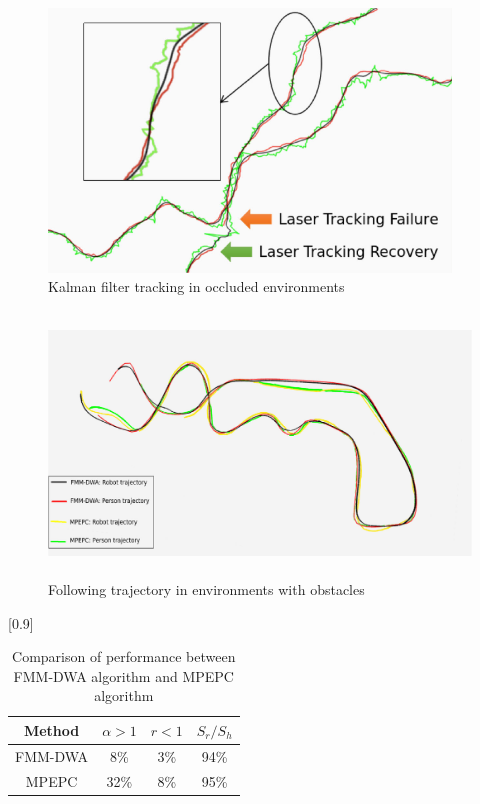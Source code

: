 \begin{figure}[h]
  \begin{center}
  \includegraphics[height=70mm,clip]{figure/2-3_aoaANDlaser.png}
  \caption{Kalman filter tracking in occluded environments
  \cite{A Robust Autonomous Following Method for Mobile Robots in Dynamic Environments}}
  \label{2-3_aoaANDlaser}
  \end{center}
\end{figure}

\begin{figure}[h]
  \begin{center}
  \includegraphics[height=70mm,clip]{figure/2-3_result.png}
  \caption{Following trajectory in environments with obstacles
  \cite{A Robust Autonomous Following Method for Mobile Robots in Dynamic Environments}}
  \label{2-3_result}
  \end{center}
\end{figure}

\begin{table}[h]
  \begin{center}
    \caption{{Comparison of performance between FMM-DWA algorithm and MPEPC algorithm
    \cite{A Robust Autonomous Following Method for Mobile Robots in Dynamic Environments}}
    \label{2-3_result_table}}
    \scalebox{1.1}[0.9]{
      \begin{tabular}{c|c|c|c} \hline
        Method & $\alpha > 1$ & $r < 1$ & $S_r / S_h$ \\ \hline
        FMM-DWA & 8\% & 3\% & 94\% \\ \hline
        MPEPC & 32\% & 8\% & 95\% \\ \hline
      \end{tabular}
    }
  \end{center}
\end{table}

